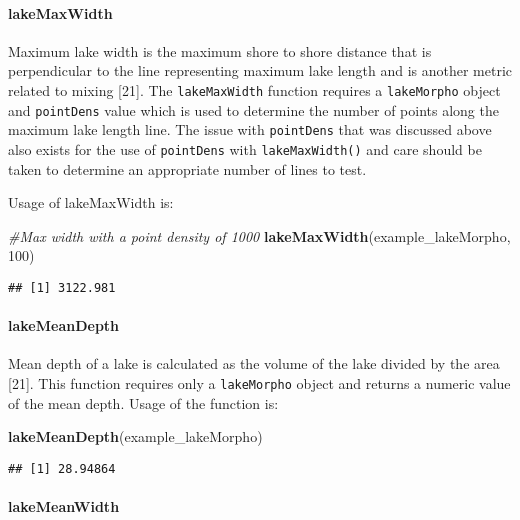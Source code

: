 \documentclass[11pt,]{article}
\newenvironment{Shaded}{\begin{snugshade}}{\end{snugshade}}
\newcommand{\KeywordTok}[1]{\textcolor[rgb]{0.13,0.29,0.53}{\textbf{{#1}}}}
\newcommand{\DecValTok}[1]{\textcolor[rgb]{0.00,0.00,0.81}{{#1}}}
\newcommand{\CommentTok}[1]{\textcolor[rgb]{0.56,0.35,0.01}{\textit{{#1}}}}
\newcommand{\NormalTok}[1]{{#1}}
\begin{document}
\paragraph{lakeMaxWidth}\label{lakemaxwidth}

Maximum lake width is the maximum shore to shore distance that is
perpendicular to the line representing maximum lake length and is
another metric related to mixing {[}21{]}. The \texttt{lakeMaxWidth}
function requires a \texttt{lakeMorpho} object and \texttt{pointDens}
value which is used to determine the number of points along the maximum
lake length line. The issue with \texttt{pointDens} that was discussed
above also exists for the use of \texttt{pointDens} with
\texttt{lakeMaxWidth()} and care should be taken to determine an
appropriate number of lines to test.

Usage of lakeMaxWidth is:

\begin{Shaded}
\begin{Highlighting}[]
\CommentTok{#Max width with a point density of 1000}
\KeywordTok{lakeMaxWidth}\NormalTok{(example_lakeMorpho, }\DecValTok{100}\NormalTok{)}
\end{Highlighting}
\end{Shaded}

\begin{verbatim}
## [1] 3122.981
\end{verbatim}

\paragraph{lakeMeanDepth}\label{lakemeandepth}

Mean depth of a lake is calculated as the volume of the lake divided by
the area {[}21{]}. This function requires only a \texttt{lakeMorpho}
object and returns a numeric value of the mean depth. Usage of the
function is:

\begin{Shaded}
\begin{Highlighting}[]
\KeywordTok{lakeMeanDepth}\NormalTok{(example_lakeMorpho)}
\end{Highlighting}
\end{Shaded}

\begin{verbatim}
## [1] 28.94864
\end{verbatim}

\paragraph{lakeMeanWidth}\label{lakemeanwidth}
\end{document}
